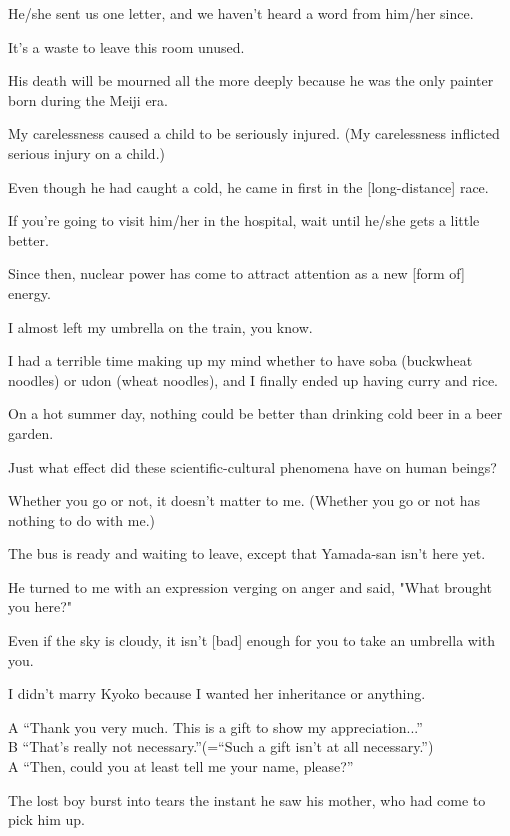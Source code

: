 \item[103.] He/she sent us one letter, and we haven't heard a word from him/her since.
\item[104.] It's a waste to leave this room unused.
\item[105.] His death will be mourned all the more deeply because he was the only painter born during the Meiji era.
\item[106.] My carelessness caused a child to be seriously injured.  (My carelessness inflicted serious injury on a child.)
\item[107.] Even though he had caught a cold, he came in first in the [long-distance] race.
\item[108.] If you're going to visit him/her in the hospital, wait until he/she gets a little better.
\item[109.]  Since then, nuclear power has come to attract attention as a new [form of] energy.
\item[110.] I almost left my umbrella on the train, you know.
\item[111.] I had a terrible time making up my mind whether to have soba (buckwheat noodles) or udon (wheat noodles), and I finally ended up having curry and rice.
\item[112.] On a hot summer day, nothing could be better than drinking cold beer in a beer garden.
\item[113.] Just what effect did these scientific-cultural phenomena have on human beings?
\item[114.] Whether you go or not, it doesn't matter to me.  (Whether you go or not has nothing to do with me.)
\item[115.] The bus is ready and waiting to leave, except that Yamada-san isn't here yet.
\item[116.] He turned to me with an expression verging on anger and said, "What brought you here?"
\item[117.] Even if the sky is cloudy, it isn't [bad] enough for you to take an umbrella with you.
\item[118.] I didn't marry Kyoko because I wanted her inheritance or anything.
\item[119.] A ``Thank you very much.  This is a gift to show my appreciation...''\\B ``That's really not necessary.''(=``Such a gift isn't at all necessary.'')\\A ``Then, could you at least tell me your name, please?''
\item[120.] The lost boy burst into tears the instant he saw his mother, who had come to pick him up.
